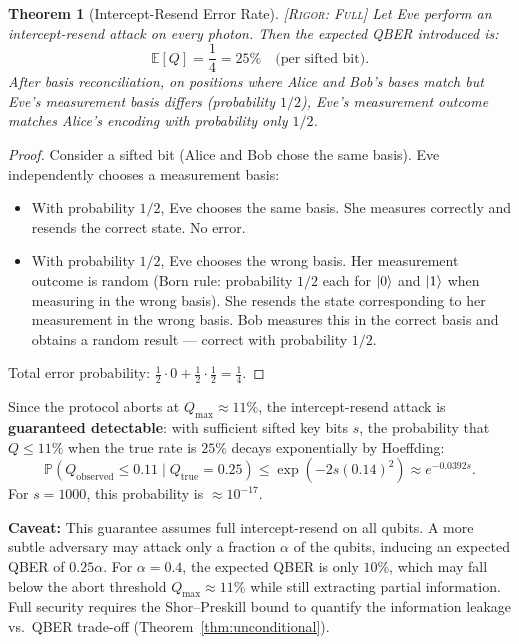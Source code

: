 \documentclass[11pt,a4paper]{article}
\theoremstyle{plain}
\newtheorem{theorem}{Theorem}[section]
\theoremstyle{definition}
\theoremstyle{remark}
\newcommand{\E}{\mathbb{E}}
\newcommand{\Pbb}{\mathbb{P}}
\newcommand{\rigorFull}{\textsc{[Rigor: Full]}}
\begin{document}
\begin{theorem}[Intercept-Resend Error Rate]
\label{thm:intercept_resend}
\rigorFull
Let Eve perform an intercept-resend attack on every photon. Then the expected
QBER introduced is:
\[
\E[Q] = \frac{1}{4} = 25\% \quad \text{(per sifted bit)}.
\]
After basis reconciliation, on positions where Alice and Bob's bases match
but Eve's measurement basis differs (probability $1/2$), Eve's measurement
outcome matches Alice's encoding with probability only $1/2$.
\end{theorem}

\begin{proof}
Consider a sifted bit (Alice and Bob chose the same basis). Eve independently
chooses a measurement basis:
\begin{itemize}
  \item With probability $1/2$, Eve chooses the same basis. She measures
        correctly and resends the correct state. No error.
  \item With probability $1/2$, Eve chooses the wrong basis. Her measurement
        outcome is random (Born rule: probability $1/2$ each for
        $\ket{0}$ and $\ket{1}$ when measuring in the wrong basis).
        She resends the state corresponding to her measurement in the
        wrong basis. Bob measures this in the correct basis and obtains
        a random result — correct with probability $1/2$.
\end{itemize}
Total error probability: $\frac{1}{2} \cdot 0 + \frac{1}{2} \cdot \frac{1}{2}
= \frac{1}{4}$.
\end{proof}

Since the protocol aborts at $Q_{\max} \approx 11\%$, the intercept-resend
attack is \textbf{guaranteed detectable}: with sufficient sifted key bits $s$,
the probability that $Q \leq 11\%$ when the true rate is $25\%$ decays
exponentially by Hoeffding:
\[
\Pbb(Q_{\text{observed}} \leq 0.11 \mid Q_{\text{true}} = 0.25)
\leq \exp(-2s(0.14)^2) \approx e^{-0.0392s}.
\]
For $s = 1000$, this probability is $\approx 10^{-17}$.

\textbf{Caveat:} This guarantee assumes full intercept-resend on all qubits.
A more subtle adversary may attack only a fraction $\alpha$ of the qubits,
inducing an expected QBER of $0.25\alpha$. For $\alpha = 0.4$, the expected
QBER is only $10\%$, which may fall below the abort threshold
$Q_{\max} \approx 11\%$ while still extracting partial information.
Full security requires the Shor--Preskill bound to quantify the information
leakage vs.\ QBER trade-off (Theorem~\ref{thm:unconditional}).
\end{document}
